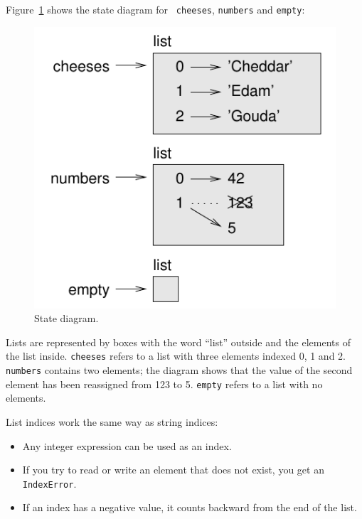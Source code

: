 \documentclass[10pt]{book}
\begin{document}
Figure~\ref{fig.liststate} shows 
the state diagram for {\tt
cheeses}, {\tt numbers} and {\tt empty}:

\begin{figure}
\centerline
{\includegraphics[scale=0.8]{figs/liststate.pdf}}
\caption{State diagram.}
\label{fig.liststate}
\end{figure}

Lists are represented by boxes with the word ``list'' outside
and the elements of the list inside.  {\tt cheeses} refers to
a list with three elements indexed 0, 1 and 2.
{\tt numbers} contains two elements; the diagram shows that the
value of the second element has been reassigned from 123 to 5.
{\tt empty} refers to a list with no elements.

List indices work the same way as string indices:

\begin{itemize}

\item Any integer expression can be used as an index.

\item If you try to read or write an element that does not exist, you
get an {\tt IndexError}.

\item If an index has a negative value, it counts backward from the
end of the list.

\end{itemize}
\end{document}
